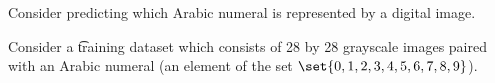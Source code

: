 

Consider predicting which Arabic numeral is represented by a digital image.


Consider a \t{training dataset} which consists of 28 by 28 grayscale images paired with an Arabic numeral (an element of the set $\set{0, 1, 2, 3, 4, 5, 6, 7, 8, 9}$).

\blankpage
